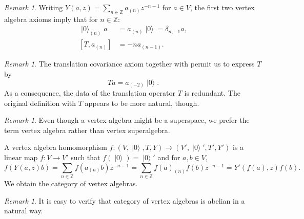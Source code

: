\documentclass[a4paper, 12pt, reqno]{amsart}
\theoremstyle{remark}
\newtheorem{remark}[theorem]{Remark}
\numberwithin{equation}{subsection}
\DeclareMathOperator{\vac}{|0\rangle}
\begin{document}
\begin{remark}
  \label{rmk:7}
  Writing $Y(a, z) = \sum_{n \in \mathbb{Z}}a_{(n)}z^{-n - 1}$ for $a \in V$, the first two vertex algebra axioms imply that for $n \in \mathbb{Z}$:
  \begin{align*}
    \vac_{(n)}a &= a_{(n)}\vac = \delta_{n, -1}a, \\  
    [T, a_{(n)}] &= -na_{(n - 1)}.
  \end{align*}
\end{remark}

\begin{remark}
  \label{rmk:8}
  The translation covariance axiom together with  permit us to express $T$ by
  \begin{equation}
    \label{eq:15}
    Ta = a_{(-2)}\vac.
  \end{equation}
  As a consequence, the data of the translation operator $T$ is redundant.
  The original definition with $T$ appears to be more natural, though.
\end{remark}

\begin{remark}
  \label{rmk:9}
  Even though a vertex algebra might be a superspace, we prefer the term vertex algebra rather than vertex superalgebra.
\end{remark}

A vertex algebra homomorphism $f: (V, \vac, T, Y) \to (V', \vac', T', Y')$ is a linear map $f: V \to V'$ such that $f(\vac) = \vac'$ and for $a, b \in V$,
\begin{equation*}
  f(Y(a, z)b) = \sum_{n \in \mathbb{Z}}f(a_{(n)}b)z^{-n - 1} = \sum_{n \in \mathbb{Z}}f(a)_{(n)}f(b)z^{-n - 1} = Y'(f(a), z)f(b).
\end{equation*}
We obtain the category of vertex algebras.

\begin{remark}
  \label{rmk:10}
  It is easy to verify that category of vertex algebras is abelian in a natural way.
\end{remark}
\end{document}
